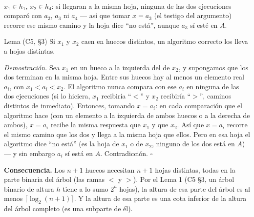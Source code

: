 \documentclass[11pt]{article}
\begin{document}
\begin{center}
\\[2pt]
{\footnotesize $x_1\in h_1$, $x_2\in h_4$: si llegaran a la misma hoja, ninguna de las dos ejecuciones
comparó con $a_2$, $a_3$ ni $a_4$ --- así que tomar $x=a_3$ (el testigo del argumento) recorre ese mismo
camino y la hoja dice ``no está'', aunque $a_3$ sí esté en $A$.}
\end{center}

\begin{resultado}{Lema (C5, §3)}
Si $x_1$ y $x_2$ caen en huecos distintos, un algoritmo correcto los lleva a hojas distintas.
\end{resultado}
\textit{Demostración.} Sea $x_1$ en un hueco a la izquierda del de $x_2$, y supongamos que los dos terminan
en la misma hoja. Entre sus huecos hay al menos un
elemento real $a_i$, con $x_1<a_i<x_2$. El algoritmo nunca compara con ese $a_i$ en ninguna de las dos
ejecuciones (si lo hiciera, $x_1$ recibiría ``$<$'' y $x_2$ recibiría ``$>$'', caminos distintos de
inmediato). Entonces, tomando $x=a_i$: en cada comparación que el algoritmo hace (con un elemento a la
izquierda de ambos huecos o a la derecha de ambos), $x=a_i$ recibe la misma respuesta que $x_1$ y que $x_2$.
Así que $x=a_i$ recorre el mismo camino que los dos y llega a la misma hoja que ellos. Pero en esa hoja el
algoritmo dice ``no está'' (es la hoja de $x_1$ o de $x_2$, ninguno de los dos está en $A$) --- y sin
embargo $a_i$ sí está en $A$. Contradicción. $\square$

\textbf{Consecuencia.} Los $n{+}1$ huecos necesitan $n{+}1$ hojas distintas, todas en la parte binaria del
árbol (las ramas $<$ y $>$). Por el Lema 1 (C5 §3, un árbol binario de altura $h$ tiene a lo sumo $2^h$
hojas), la altura de esa parte del árbol es al menos $\lceil\log_2(n{+}1)\rceil$. Y la altura de esa parte
es una cota inferior de la altura del árbol completo (es una subparte de él).
\end{document}
